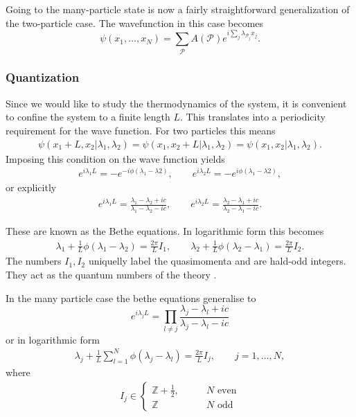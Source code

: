 \documentclass[11pt, a4paper,draft]{report} %
\begin{document}
Going to the many-particle state is now a fairly straightforward generalization of the two-particle case.
The wavefunction in this case becomes \cite{Franchini2017}
\begin{equation}
	\psi(x_1,\ldots,x_N) = \sum_{\mathcal{P}} A(\mathcal{P}) e^{i\sum_j \lambda_{\mathcal{P}_j} x_j}.
\end{equation}


\subsubsection{Quantization}

Since we would like to study the thermodynamics of the system, it is convenient to confine the system to a finite length \(L\).
This translates into a periodicity requirement for the wave function.
For two particles this means
\begin{align}
	\psi(x_1+L,x_2|\lambda_1,\lambda_2) = \psi(x_1,x_2+L|\lambda_1,\lambda_2) = \psi(x_1,x_2|\lambda_1,\lambda_2).
\end{align}
Imposing this condition on the wave function yields
\begin{align}
  e^{i\lambda_1L} = - e^{-i\phi(\lambda_1 - \lambda2)}, \qquad e^{i\lambda_2L} = - e^{i\phi(\lambda_1 - \lambda2)},
\end{align}
or explicitly \cite{tofind}
\begin{align}
  e^{i\lambda_1L} = \frac{\lambda_1-\lambda_2 + ic}{\lambda_1-\lambda_2-ic}, \qquad e^{i\lambda_2L} = \frac{\lambda_2-\lambda_1 + ic}{\lambda_2-\lambda_1-ic}.
\end{align}

These are known as the Bethe equations.
In logarithmic form this becomes 
\begin{align}\label{eq:bethe_equations}
  \lambda_1 + \frac{1}{L} \phi(\lambda_1-\lambda_2) = \frac{2\pi}{L} I_1, \qquad \lambda_2 + \frac{1}{L} \phi(\lambda_2-\lambda_1) = \frac{2\pi}{L} I_2.
\end{align}
The numbers \(I_1, I_2\) uniquelly label the quasimomenta and are hald-odd integers. 
They act as the quantum numbers of the theory \cite{tofind}.

In the many particle case the bethe equations generalise to
\begin{equation}
  e^{i\lambda_jL} = \prod_{l\neq j} \frac{\lambda_j-\lambda_l + ic}{\lambda_j - \lambda_l - ic}
\end{equation}
or in logarithmic form
\begin{align}
  \lambda_j + \frac{1}{L} \sum_{l=1}^N \phi(\lambda_j - \lambda_l) = \frac{2\pi}{L}I_j, \qquad j = 1,\ldots,N,
\end{align}
where \cite{tofind}
\begin{align}
I_j \in 
\begin{cases}
  \mathbb{Z} + \frac{1}{2}, \qquad &N \textrm{ even}\\
  \mathbb{Z}  &N \textrm{ odd}
\end{cases}
\end{align}
\end{document}
